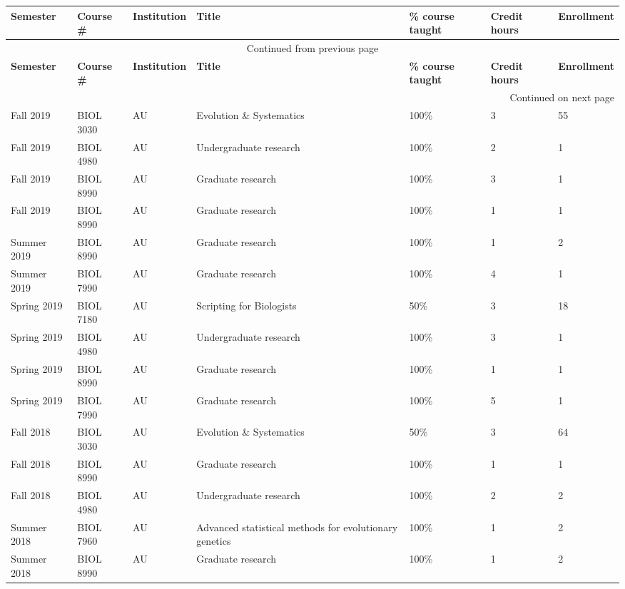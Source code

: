 {\sffamily\small
\begin{longtable}[l]{ @{} p{0.7in} p{0.7in} p{0.7in} p{1.5in} p{0.7in} p{0.4in} p{0.8in} @{} }
    \hline
    \textbf{Semester} & \textbf{Course \#} & \textbf{Institution} & \textbf{Title} & \textbf{\% course taught} & \textbf{Credit hours} & \textbf{Enrollment} \\
    \hline
    \endfirsthead
    \multicolumn{7}{c}{{Continued from previous page}} \\
    \hline
    \textbf{Semester} & \textbf{Course \#} & \textbf{Institution} & \textbf{Title} & \textbf{\% course taught} & \textbf{Credit hours} & \textbf{Enrollment} \\
    \hline
    \endhead
    \hline \multicolumn{7}{|r|}{{Continued on next page}} \\
    \endfoot
    \hline
    \endlastfoot
    Fall 2019 & BIOL 3030 & AU & Evolution \& Systematics & 100\% & 3 & 55 \\
    Fall 2019 & BIOL 4980 & AU & Undergraduate research & 100\% & 2 & 1 \\ 
    Fall 2019 & BIOL 8990 & AU & Graduate research & 100\% & 3 & 1 \\ 
    Fall 2019 & BIOL 8990 & AU & Graduate research & 100\% & 1 & 1 \\ 
    Summer 2019 & BIOL 8990 & AU & Graduate research & 100\% & 1 & 2 \\ 
    Summer 2019 & BIOL 7990 & AU & Graduate research & 100\% & 4 & 1 \\ 
    Spring 2019 & BIOL 7180 & AU & Scripting for Biologists & 50\% & 3 & 18 \\
    Spring 2019 & BIOL 4980 & AU & Undergraduate research & 100\% & 3 & 1 \\ 
    Spring 2019 & BIOL 8990 & AU & Graduate research & 100\% & 1 & 1 \\ 
    Spring 2019 & BIOL 7990 & AU & Graduate research & 100\% & 5 & 1 \\ 
    Fall 2018 & BIOL 3030 & AU & Evolution \& Systematics & 50\% & 3 & 64 \\
    Fall 2018 & BIOL 8990 & AU & Graduate research & 100\% & 1 & 1 \\ 
    Fall 2018 & BIOL 4980 & AU & Undergraduate research & 100\% & 2 & 2 \\ 
    Summer 2018 & BIOL 7960 & AU & Advanced statistical methods for evolutionary genetics & 100\% & 1 & 2 \\
    Summer 2018 & BIOL 8990 & AU & Graduate research & 100\% & 1 & 2 \\ 

\end{longtable}}

